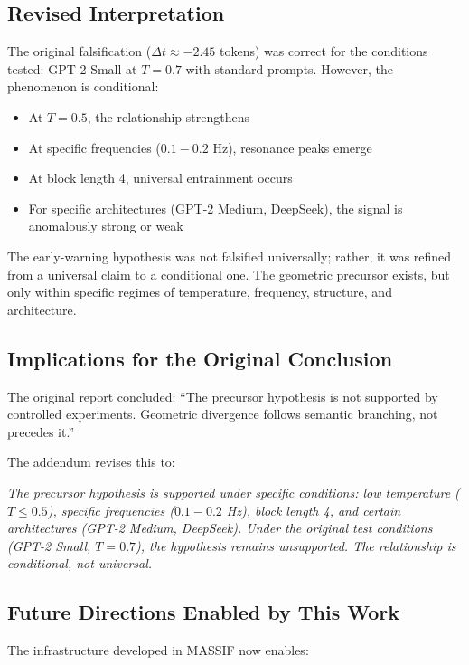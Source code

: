 \documentclass[12pt,a4paper]{article}
\begin{document}
\subsection{Revised Interpretation}

The original falsification ($\Delta t \approx -2.45$ tokens) was correct for the conditions tested: GPT-2 Small at $T=0.7$ with standard prompts. However, the phenomenon is conditional:

\begin{itemize}
    \item At $T=0.5$, the relationship strengthens
    \item At specific frequencies ($0.1-0.2$ Hz), resonance peaks emerge
    \item At block length 4, universal entrainment occurs
    \item For specific architectures (GPT-2 Medium, DeepSeek), the signal is anomalously strong or weak
\end{itemize}

The early-warning hypothesis was not falsified universally; rather, it was refined from a universal claim to a conditional one. The geometric precursor exists, but only within specific regimes of temperature, frequency, structure, and architecture.

\subsection{Implications for the Original Conclusion}

The original report concluded: ``The precursor hypothesis is not supported by controlled experiments. Geometric divergence follows semantic branching, not precedes it.''

The addendum revises this to:

\textit{The precursor hypothesis is supported under specific conditions: low temperature ($T \leq 0.5$), specific frequencies ($0.1-0.2$ Hz), block length 4, and certain architectures (GPT-2 Medium, DeepSeek). Under the original test conditions (GPT-2 Small, $T=0.7$), the hypothesis remains unsupported. The relationship is conditional, not universal.}

\subsection{Future Directions Enabled by This Work}

The infrastructure developed in MASSIF now enables:
\end{document}
